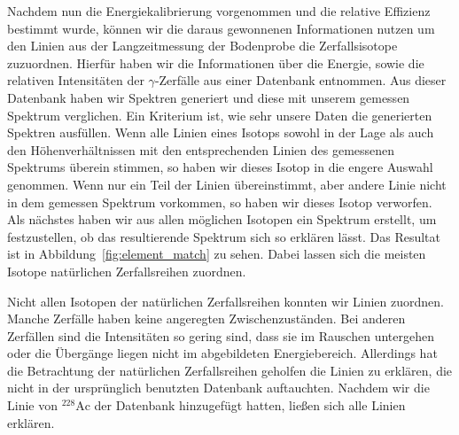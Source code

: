 \documentclass[11pt, ngerman, fleqn, DIV=15, headinclude, BCOR=2cm]{scrreprt}
\begin{document}
Nachdem nun die Energiekalibrierung vorgenommen und die relative
Effizienz bestimmt wurde, können wir die daraus gewonnenen Informationen nutzen
um den Linien aus der Langzeitmessung der Bodenprobe die Zerfallsisotope
zuzuordnen.
Hierfür haben wir die Informationen über die Energie, sowie die relativen
Intensitäten der $\gamma$-Zerfälle aus einer Datenbank
\parencite{IAEA-gamma-ray-database} entnommen.
Aus dieser Datenbank haben wir Spektren generiert und diese mit unserem gemessen
Spektrum verglichen.
Ein Kriterium ist, wie sehr unsere Daten die generierten Spektren
ausfüllen. Wenn alle Linien eines Isotops sowohl in der Lage als auch den
Höhenverhältnissen
mit den entsprechenden Linien des gemessenen Spektrums überein stimmen, so haben
wir dieses Isotop in die engere Auswahl genommen. Wenn nur ein Teil der Linien
übereinstimmt, aber andere Linie nicht in dem gemessen Spektrum vorkommen, so
haben wir dieses Isotop verworfen.
Als nächstes haben wir aus allen möglichen Isotopen ein Spektrum erstellt, um
festzustellen, ob das resultierende Spektrum sich so erklären lässt.
Das Resultat ist in Abbildung~\ref{fig:element_match} zu sehen.
Dabei lassen sich die meisten Isotope natürlichen Zerfallsreihen zuordnen.

Nicht allen Isotopen der natürlichen Zerfallsreihen konnten wir Linien
zuordnen. Manche Zerfälle haben keine angeregten Zwischenzuständen. Bei anderen
Zerfällen sind die
Intensitäten so gering sind, dass sie im Rauschen untergehen oder die Übergänge liegen
nicht im abgebildeten Energiebereich. Allerdings hat die Betrachtung der
natürlichen Zerfallsreihen geholfen die Linien zu erklären, die nicht in der
ursprünglich benutzten Datenbank auftauchten. Nachdem wir die Linie von
$^{228}\text{Ac}$ der Datenbank hinzugefügt hatten, ließen sich alle Linien
erklären. 
\end{document}
